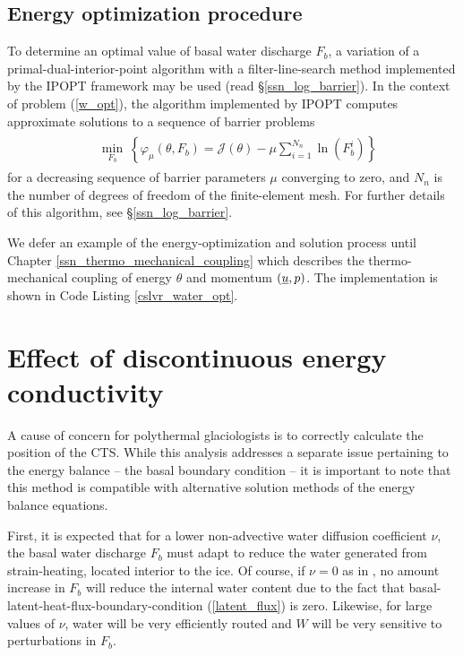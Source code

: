 \subsection{Energy optimization procedure}

To determine an optimal value of basal water discharge $F_b$, a variation of a primal-dual-interior-point algorithm with a filter-line-search method implemented by the IPOPT framework \citep{waechter_2006} may be used (read \S \ref{ssn_log_barrier}).  In the context of problem (\ref{w_opt}), the algorithm implemented by IPOPT computes approximate solutions to a sequence of barrier problems
\begin{align}
\begin{aligned}
  &\min_{F_b}\ \left\{ \varphi_{\mu}(\theta, F_b) = \mathscr{J}(\theta) - \mu \sum_{i=1}^{N_n} \ln(F_b^i) \right\}
\end{aligned}
\label{energy_barrier}
\end{align}
for a decreasing sequence of barrier parameters $\mu$ converging to zero, and $N_n$ is the number of degrees of freedom of the finite-element mesh.  For further details of this algorithm, see \S \ref{ssn_log_barrier}.

We defer an example of the energy-optimization and solution process until Chapter \ref{ssn_thermo_mechanical_coupling} which describes the thermo-mechanical coupling of energy $\theta$ and momentum $(\underline{u}, p)$.  The \CSLVR implementation is shown in Code Listing \ref{cslvr_water_opt}.


\section{Effect of discontinuous energy conductivity}

A cause of concern for polythermal glaciologists is to correctly calculate the position of the CTS.  While this analysis addresses a separate issue pertaining to the energy balance -- the basal boundary condition -- it is important to note that this method is compatible with alternative solution methods of the energy balance equations.

First, it is expected that for a lower non-advective water diffusion coefficient $\nu$, the basal water discharge $F_b$ must adapt to reduce the water generated from strain-heating, located interior to the ice.  Of course, if $\nu = 0$ as in \citet{greve_2009}, no amount increase in $F_b$ will reduce the internal water content due to the fact that basal-latent-heat-flux-boundary-condition (\ref{latent_flux}) is zero.  Likewise, for large values of $\nu$, water will be very efficiently routed and $W$ will be very sensitive to perturbations in $F_b$.

